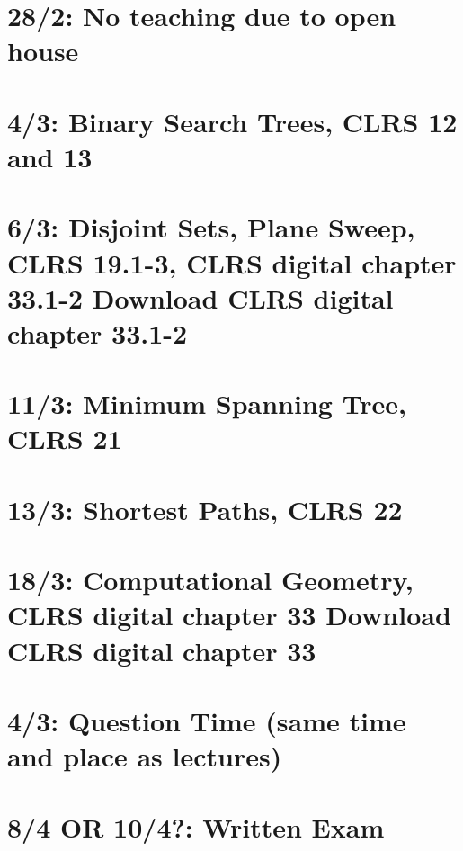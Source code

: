 \section{28/2: No teaching due to open house}
\section{4/3: Binary Search Trees, CLRS 12 and 13}
\section{6/3: Disjoint Sets, Plane Sweep, CLRS 19.1-3, CLRS digital chapter 33.1-2
  Download CLRS digital chapter 33.1-2}
\section{11/3: Minimum Spanning Tree, CLRS 21}
\section{13/3: Shortest Paths, CLRS 22}
\section{18/3: Computational Geometry, CLRS digital chapter 33
  Download CLRS digital chapter 33}
\section{4/3: Question Time (same time and place as lectures)}
\section{8/4 OR 10/4?: Written Exam}
